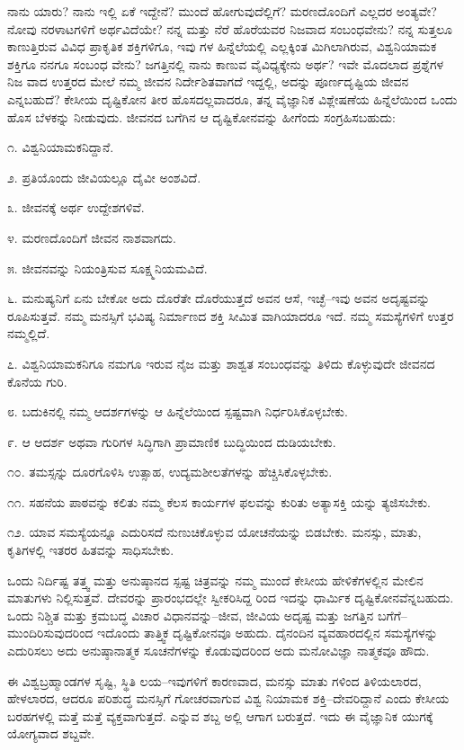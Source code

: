 ನಾನು ಯಾರು? ನಾನು ಇಲ್ಲಿ ಏಕೆ ಇದ್ದೇನೆ? ಮುಂದೆ ಹೋಗುವುದೆಲ್ಲಿಗೆ? ಮರಣದೊಂದಿಗೆ ಎಲ್ಲದರ ಅಂತ್ಯವೇ? ನೋವು ನರಳಾಟಗಳಿಗೆ ಅರ್ಥವಿದೆಯೇ? ನನ್ನ ಮತ್ತು ನೆರೆ ಹೊರೆಯವರ ನಿಜವಾದ ಸಂಬಂಧವೇನು? ನನ್ನ ಸುತ್ತಲೂ ಕಾಣುತ್ತಿರುವ ವಿವಿಧ ಪ್ರಾಕೃತಿಕ ಶಕ್ತಿಗಳಿಗೂ, ಇವು ಗಳ ಹಿನ್ನೆಲೆಯಲ್ಲಿ ಎಲ್ಲಕ್ಕಿಂತ ಮಿಗಿಲಾಗಿರುವ, ವಿಶ್ವನಿಯಾಮಕ ಶಕ್ತಿಗೂ ನನಗೂ ಸಂಬಂಧ ವೇನು? ಜಗತ್ತಿನಲ್ಲಿ ನಾನು ಕಾಣುವ ವೈವಿಧ್ಯಕ್ಕೇನು ಅರ್ಥ? ಇವೇ ಮೊದಲಾದ ಪ್ರಶ್ನೆಗಳ ನಿಜ ವಾದ ಉತ್ತರದ ಮೇಲೆ ನಮ್ಮ ಜೀವನ ನಿರ್ದೇಶಿತವಾಗದೆ ಇದ್ದಲ್ಲಿ, ಅದನ್ನು ಪೂರ್ಣದೃಷ್ಟಿಯ ಜೀವನ ಎನ್ನಬಹುದೆ? ಕೇಸೀಯ ದೃಷ್ಟಿಕೋನ ತೀರ ಹೊಸದಲ್ಲವಾದರೂ, ತನ್ನ ವೈಜ್ಞಾನಿಕ ವಿಶ್ಲೇಷಣೆಯ ಹಿನ್ನೆಲೆಯಿಂದ ಒಂದು ಹೊಸ ಬೆಳಕನ್ನು ನೀಡುವುದು. ಜೀವನದ ಬಗೆಗಿನ ಆ ದೃಷ್ಟಿಕೋನವನ್ನು ಹೀಗೆಂದು ಸಂಗ್ರಹಿಸಬಹುದು:

೧. ವಿಶ್ವನಿಯಾಮಕನಿದ್ದಾನೆ.

೨. ಪ್ರತಿಯೊಂದು ಜೀವಿಯಲ್ಲೂ ದೈವೀ ಅಂಶವಿದೆ.

೩. ಜೀವನಕ್ಕೆ ಅರ್ಥ ಉದ್ದೇಶಗಳಿವೆ.

೪. ಮರಣದೊಂದಿಗೆ ಜೀವನ ನಾಶವಾಗದು.

೫. ಜೀವನವನ್ನು ನಿಯಂತ್ರಿಸುವ ಸೂಕ್ಷ್ಮನಿಯಮವಿದೆ.

೬. ಮನುಷ್ಯನಿಗೆ ಏನು ಬೇಕೋ ಅದು ದೊರೆತೇ ದೊರೆಯುತ್ತದೆ ಅವನ ಆಸೆ, ಇಚ್ಛೆ–ಇವು ಅವನ ಅದೃಷ್ಟವನ್ನು ರೂಪಿಸುತ್ತವೆ. ನಮ್ಮ ಮನಸ್ಸಿಗೆ ಭವಿಷ್ಯ ನಿರ್ಮಾಣದ ಶಕ್ತಿ ಸೀಮಿತ ವಾಗಿಯಾದರೂ ಇದೆ. ನಮ್ಮ ಸಮಸ್ಯೆಗಳಿಗೆ ಉತ್ತರ ನಮ್ಮಲ್ಲಿದೆ.

೭. ವಿಶ್ವನಿಯಾಮಕನಿಗೂ ನಮಗೂ ಇರುವ ನೈಜ ಮತ್ತು ಶಾಶ್ವತ ಸಂಬಂಧವನ್ನು ತಿಳಿದು ಕೊಳ್ಳುವುದೇ ಜೀವನದ ಕೊನೆಯ ಗುರಿ.

೮. ಬದುಕಿನಲ್ಲಿ ನಮ್ಮ ಆದರ್ಶಗಳನ್ನು ಆ ಹಿನ್ನೆಲೆಯಿಂದ ಸ್ಪಷ್ಟವಾಗಿ ನಿರ್ಧರಿಸಿಕೊಳ್ಳಬೇಕು.

೯. ಆ ಆದರ್ಶ ಅಥವಾ ಗುರಿಗಳ ಸಿದ್ಧಿಗಾಗಿ ಪ್ರಾಮಾಣಿಕ ಬುದ್ಧಿಯಿಂದ ದುಡಿಯಬೇಕು.

೧೦. ತಮಸ್ಸನ್ನು ದೂರಗೊಳಿಸಿ ಉತ್ಸಾಹ, ಉದ್ಯಮಶೀಲತೆಗಳನ್ನು ಹೆಚ್ಚಿಸಿಕೊಳ್ಳಬೇಕು.

೧೧. ಸಹನೆಯ ಪಾಠವನ್ನು ಕಲಿತು ನಮ್ಮ ಕೆಲಸ ಕಾರ್ಯಗಳ ಫಲವನ್ನು ಕುರಿತು ಅತ್ಯಾಸಕ್ತಿ ಯನ್ನು ತ್ಯಜಿಸಬೇಕು.

೧೨. ಯಾವ ಸಮಸ್ಯೆಯನ್ನೂ ಎದುರಿಸದೆ ನುಣುಚಿಕೊಳ್ಳುವ ಯೋಚನೆಯನ್ನು ಬಿಡಬೇಕು. ಮನಸ್ಸು, ಮಾತು, ಕೃತಿಗಳಲ್ಲಿ ಇತರರ ಹಿತವನ್ನು ಸಾಧಿಸಬೇಕು.

ಒಂದು ನಿರ್ದಿಷ್ಟ ತತ್ತ್ವ ಮತ್ತು ಅನುಷ್ಠಾನದ ಸ್ಪಷ್ಟ ಚಿತ್ರವನ್ನು ನಮ್ಮ ಮುಂದೆ ಕೇಸೀಯ ಹೇಳಿಕೆಗಳಲ್ಲಿನ ಮೇಲಿನ ಮಾತುಗಳು ನಿಲ್ಲಿಸುತ್ತವೆ. ದೇವರನ್ನು ಪ್ರಾರಂಭದಲ್ಲೇ ಸ್ವೀಕರಿಸಿದ್ದ ರಿಂದ ಇದನ್ನು ಧಾರ್ಮಿಕ ದೃಷ್ಟಿಕೋನವೆನ್ನಬಹುದು. ಒಂದು ನಿಶ್ಚಿತ ಮತ್ತು ಕ್ರಮಬದ್ಧ ವಿಚಾರ ವಿಧಾನವನ್ನು–ಜೀವ, ಜೀವಿಯ ಅದೃಷ್ಟ ಮತ್ತು ಜಗತ್ತಿನ ಬಗೆಗೆ–ಮುಂದಿರಿಸುವುದರಿಂದ ಇದೊಂದು ತಾತ್ತ್ವಿಕ ದೃಷ್ಟಿಕೋನವೂ ಅಹುದು. ದೈನಂದಿನ ವ್ಯವಹಾರದಲ್ಲಿನ ಸಮಸ್ಯೆಗಳನ್ನು ಎದುರಿಸಲು ಅದು ಅನುಷ್ಠಾನಾತ್ಮಕ ಸೂಚನೆಗಳನ್ನು ಕೊಡುವುದರಿಂದ ಅದು ಮನೋವಿಜ್ಞಾ ನಾತ್ಮಕವೂ ಹೌದು.

ಈ ವಿಶ್ವಬ್ರಹ್ಮಾಂಡಗಳ ಸೃಷ್ಟಿ, ಸ್ಥಿತಿ ಲಯ–ಇವುಗಳಿಗೆ ಕಾರಣವಾದ, ಮನಸ್ಸು ಮಾತು ಗಳಿಂದ ತಿಳಿಯಲಾರದ, ಹೇಳಲಾರದ, ಆದರೂ ಪರಿಶುದ್ಧ ಮನಸ್ಸಿಗೆ ಗೋಚರವಾಗುವ ವಿಶ್ವ ನಿಯಾಮಕ ಶಕ್ತಿ–ದೇವರಿದ್ದಾನೆ ಎಂದು ಕೇಸೀಯ ಬರಹಗಳಲ್ಲಿ ಮತ್ತೆ ಮತ್ತೆ ವ್ಯಕ್ತವಾಗುತ್ತದೆ.  ಎನ್ನುವ ಶಬ್ದ ಅಲ್ಲಿ ಆಗಾಗ ಬರುತ್ತದೆ. ಇದು ಈ ವೈಜ್ಞಾನಿಕ ಯುಗಕ್ಕೆ ಯೋಗ್ಯವಾದ ಶಬ್ದವೇ.


